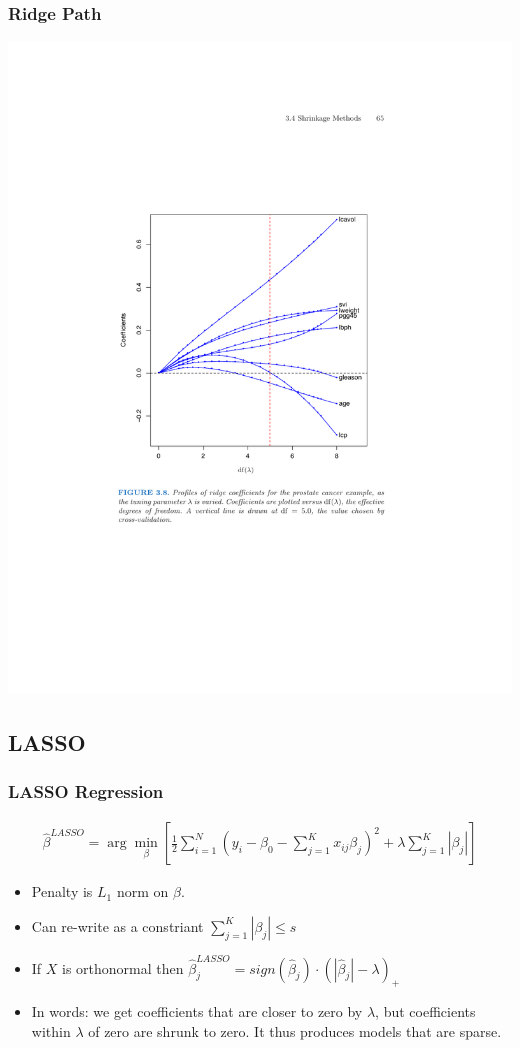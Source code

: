     
\begin{frame}
    \frametitle{Ridge Path}
    \vspace{-15pt}
    \begin{center}
    \includegraphics[width=.85\textwidth]{./resources/ridgepath}
    \end{center}
\end{frame}
    
\subsection{LASSO}

\begin{frame}
\frametitle{LASSO Regression}
\begin{eqnarray*}
\hat{\beta}^{LASSO} = \arg \min_{\beta} \left[\frac{1}{2} \sum_{i=1}^N (y_i - \beta_0 - \sum_{j=1}^K x_{ij} \beta_j)^2 + \lambda \sum_{j=1}^K | \beta_j| \right]
\end{eqnarray*}
\begin{itemize}
\item Penalty is $L_1$ norm on $\beta$.
\item Can re-write as a constriant  $\sum_{j=1}^K | \beta_j| \leq s$
\item If $X$ is orthonormal then $\hat{\beta}_{j}^{LASSO} = sign(\hat{\beta}_j ) \cdot (| \hat{\beta}_j |- \lambda )_{+}$
\item In words: we get coefficients that are closer to zero by $\lambda$, but coefficients within $\lambda$ of zero are shrunk to zero. It thus produces models that are \alert{sparse}.
\end{itemize}
\end{frame}


